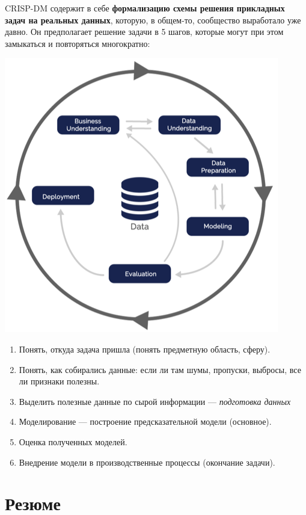 \documentclass{article}
\begin{document}
CRISP-DM содержит в себе \textbf{формализацию схемы решения прикладных задач на реальных данных}, которую, в общем-то, сообщество выработало уже давно. Он предполагает решение задачи в 5 шагов, которые могут при этом замыкаться и повторяться многократно:

\begin{center}
    \includegraphics[scale=1]{2_6.png}
\end{center}

\begin{enumerate}
\item Понять, откуда задача пришла (понять предметную область, сферу).
\item Понять, как собирались данные: если ли там шумы, пропуски, выбросы, все ли признаки полезны.
\item Выделить полезные данные по сырой информации --- \textit{подготовка данных}
\item Моделирование --- построение предсказательной модели (основное).
\item Оценка полученных моделей.
\item Внедрение модели в производственные процессы (окончание задачи).
\end{enumerate}

\newpage
\section{Резюме}
\end{document}
